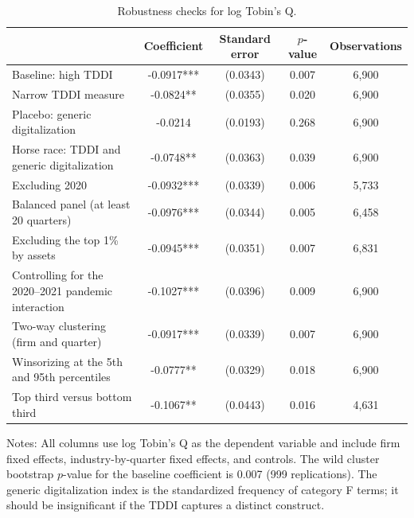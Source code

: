 \begin{table}[htbp]
\centering
\small
\caption{Robustness checks for log Tobin's Q.}
\label{tab:robust}
\begin{threeparttable}
\begin{tabular}{lcccc}
\toprule
 & Coefficient & Standard error & $p$-value & Observations \\
\midrule
Baseline: high TDDI & -0.0917*** & (0.0343) & 0.007 & 6,900 \\
Narrow TDDI measure & -0.0824** & (0.0355) & 0.020 & 6,900 \\
Placebo: generic digitalization & -0.0214 & (0.0193) & 0.268 & 6,900 \\
Horse race: TDDI and generic digitalization & -0.0748** & (0.0363) & 0.039 & 6,900 \\
Excluding 2020 & -0.0932*** & (0.0339) & 0.006 & 5,733 \\
Balanced panel (at least 20 quarters) & -0.0976*** & (0.0344) & 0.005 & 6,458 \\
Excluding the top 1\% by assets & -0.0945*** & (0.0351) & 0.007 & 6,831 \\
Controlling for the 2020--2021 pandemic interaction & -0.1027*** & (0.0396) & 0.009 & 6,900 \\
Two-way clustering (firm and quarter) & -0.0917*** & (0.0339) & 0.007 & 6,900 \\
Winsorizing at the 5th and 95th percentiles & -0.0777** & (0.0329) & 0.018 & 6,900 \\
Top third versus bottom third & -0.1067** & (0.0443) & 0.016 & 4,631 \\
\bottomrule
\end{tabular}
\begin{tablenotes}[flushleft]
\footnotesize
\item Notes: All columns use log Tobin's Q as the dependent variable and include firm fixed effects, industry-by-quarter fixed effects, and controls. The wild cluster bootstrap $p$-value for the baseline coefficient is 0.007 (999 replications). The generic digitalization index is the standardized frequency of category F terms; it should be insignificant if the TDDI captures a distinct construct.
\end{tablenotes}
\end{threeparttable}
\end{table}
